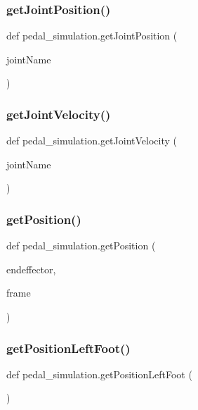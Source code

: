 \subsubsection{\texorpdfstring{getJointPosition()}{getJointPosition()}}
{\footnotesize\ttfamily def pedal\+\_\+simulation.\+get\+Joint\+Position (\begin{DoxyParamCaption}\item[{}]{joint\+Name }\end{DoxyParamCaption})}

\mbox{\label{namespacepedal__simulation_a0ee75e78af6b0ac572720f7d805c8627}} 
\subsubsection{\texorpdfstring{getJointVelocity()}{getJointVelocity()}}
{\footnotesize\ttfamily def pedal\+\_\+simulation.\+get\+Joint\+Velocity (\begin{DoxyParamCaption}\item[{}]{joint\+Name }\end{DoxyParamCaption})}

\mbox{\label{namespacepedal__simulation_a95f712bb817f4aa1a6c75e18db6fd705}} 
\subsubsection{\texorpdfstring{getPosition()}{getPosition()}}
{\footnotesize\ttfamily def pedal\+\_\+simulation.\+get\+Position (\begin{DoxyParamCaption}\item[{}]{endeffector,  }\item[{}]{frame }\end{DoxyParamCaption})}

\mbox{\label{namespacepedal__simulation_ad388c8b092cbc564fdca15fbcbeeb0fe}} 
\subsubsection{\texorpdfstring{getPositionLeftFoot()}{getPositionLeftFoot()}}
{\footnotesize\ttfamily def pedal\+\_\+simulation.\+get\+Position\+Left\+Foot (\begin{DoxyParamCaption}{ }\end{DoxyParamCaption})}

